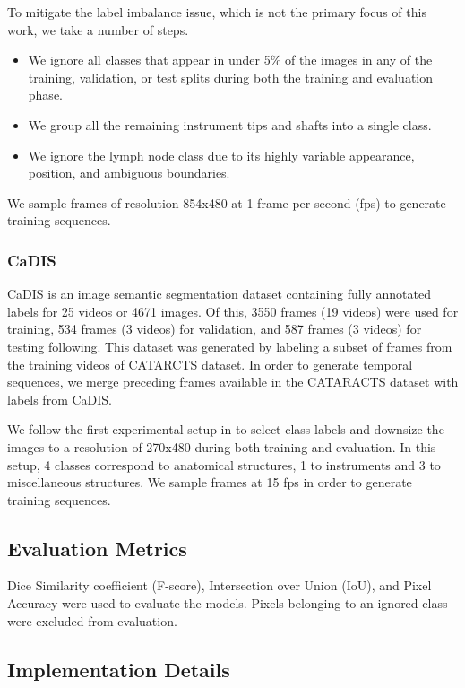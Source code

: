 \documentclass[twoside, print]{ieeecolor_arxiv}
\begin{document}
To mitigate the label imbalance issue, which is not the primary focus of this work, we take a number of steps. 
\begin{itemize}
    \item We ignore all classes that appear in under 5\% of the images in any of the training, validation, or test splits during both the training and evaluation phase.
    \item We group all the remaining instrument tips and shafts into a single class.
    \item We ignore the lymph node class due to its highly variable appearance, position, and ambiguous boundaries.
\end{itemize}
We sample frames of resolution 854x480 at 1 frame per second (fps) to generate training sequences. 


\subsubsection{CaDIS}
CaDIS\cite{cadis} is an image semantic segmentation dataset containing fully annotated labels for 25 videos or 4671 images. Of this, 3550 frames (19 videos) were used for training, 534 frames (3 videos) for validation, and 587 frames (3 videos) for testing following\cite{cadis}. This dataset was generated by labeling a subset of frames from the training videos of CATARCTS\cite{cataracts} dataset. In order to generate temporal sequences, we merge preceding frames available in the CATARACTS dataset with labels from CaDIS.
 
We follow the first experimental setup in \cite{cadis} to select class labels and downsize the images to a resolution of 270x480 during both training and evaluation. In this setup, 4 classes correspond to anatomical structures, 1 to instruments and 3 to miscellaneous structures. We sample frames at 15 fps in order to generate training sequences. 



\subsection{Evaluation Metrics}

Dice Similarity coefficient (F-score), Intersection over Union (IoU), and Pixel Accuracy were used to evaluate the models. Pixels belonging to an ignored class were excluded from evaluation. 

\subsection{Implementation Details}
\end{document}
